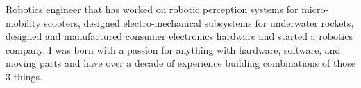 

\begin{cvparagraph}

Robotics engineer that has worked on robotic perception systems for
micro-mobility scooters, designed electro-mechanical subsystems for underwater
rockets, designed and manufactured consumer electronics hardware and started a
robotics company. I was born with a passion for anything with hardware,
software, and moving parts and have over a decade of experience building
combinations of those 3 things. 
\end{cvparagraph}
